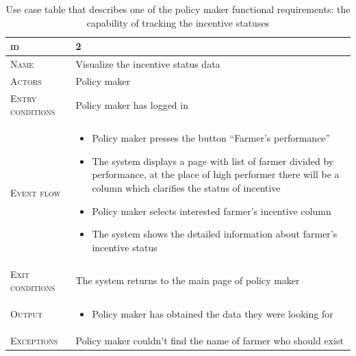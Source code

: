\begin{table}[H]
    \centering
    \begin{tabular}{|l|p{}|}
        \hline %
    	\textsc{id}                 &   2\\
    	\hline %
    	\textsc{Name}               &   Visualize the incentive status data\\
    	\hline %
    	\textsc{Actors}             &   Policy maker\\
    	\hline %
    	\textsc{Entry conditions}   &   Policy maker has logged in\\
    	\hline %
    	\textsc{Event flow}         &   %
            	                        \begin{itemize}
                                    	    \item Policy maker presses the button “Farmer’s performance”
                                    		\item The system displays a page with list of farmer divided by performance, at the place of high performer there will be a column which clarifies the status of incentive 
                                       		\item Policy maker selects interested farmer’s incentive column
                                    		\item The system shows the detailed information about farmer’s incentive status
                                        \end{itemize}\\
        \hline %
        \textsc{Exit conditions}    &  The system returns to the main page of policy maker\\
    	\hline %
    	\textsc{Output}             &  \begin{itemize}
    	    \item Policy maker has obtained the data they were looking for
    	\end{itemize}\\
    	\hline %
    	\textsc{Exceptions}         &  Policy maker couldn’t find the name of farmer who should exist\\
    	\hline %
        
    \end{tabular}
    \caption{\label{tab:visualize_incentives}Use case table that describes one of the policy maker functional requirements:  the capability of tracking the incentive statuses} %
\end{table}

